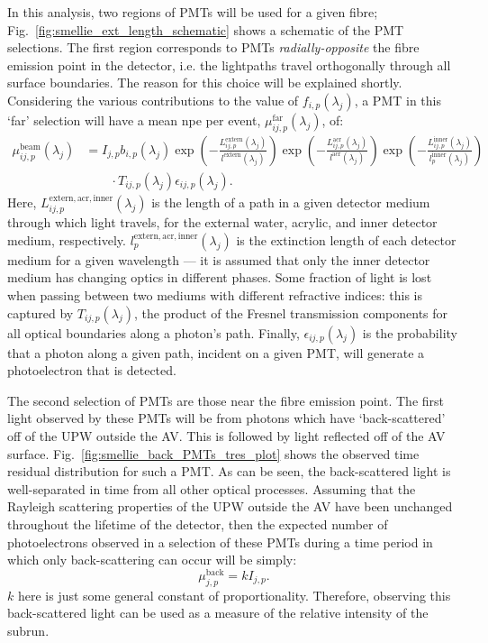 In this analysis, two regions of PMTs will be used for a given fibre; Fig.~\ref{fig:smellie_ext_length_schematic} shows a schematic of the PMT selections. The first region corresponds to PMTs \textit{radially-opposite} the fibre emission point in the detector, i.e. the lightpaths travel orthogonally through all surface boundaries. The reason for this choice will be explained shortly. Considering the various contributions to the value of $f_{i,p}(\lambda_{j})$, a PMT in this `far' selection will have a mean npe per event, $\mu_{ij,p}^{\mathrm{far}}(\lambda_{j})$, of:
\begin{align}\label{eq:smellie_ext_length_theory}
    \mu_{ij,p}^{\mathrm{beam}}(\lambda_{j}) &= I_{j,p}b_{i,p}(\lambda_{j})
    \exp\left(
        -\frac{L_{ij,p}^{\mathrm{extern}}(\lambda_{j})}{l^{\mathrm{extern}}(\lambda_{j})}
    \right)
    \exp\left(
        -\frac{L_{ij,p}^{\mathrm{acr}}(\lambda_{j})}{l^{\mathrm{acr}}(\lambda_{j})}
    \right)
    \exp\left(
        -\frac{L_{ij,p}^{\mathrm{inner}}(\lambda_{j})}{l_{p}^{\mathrm{inner}}(\lambda_{j})}
    \right)\nonumber\\
    & \qquad\cdot T_{ij,p}(\lambda_{j})\epsilon_{ij,p}(\lambda_{j}).
\end{align}
Here, $L_{ij,p}^{\mathrm{extern,acr,inner}}(\lambda_{j})$ is the length of a path in a given detector medium through which light travels, for the external water, acrylic, and inner detector medium, respectively. $l_{p}^{\mathrm{extern,acr,inner}}(\lambda_{j})$ is the extinction length of each detector medium for a given wavelength --- it is assumed that only the inner detector medium has changing optics in different phases. Some fraction of light is lost when passing between two mediums with different refractive indices: this is captured by $T_{ij,p}(\lambda_{j})$, the product of the Fresnel transmission components for all optical boundaries along a photon's path. Finally, $\epsilon_{ij,p}(\lambda_{j})$ is the probability that a photon along a given path, incident on a given PMT, will generate a photoelectron that is detected. 

The second selection of PMTs are those near the fibre emission point. The first light observed by these PMTs will be from photons which have `back-scattered' off of the UPW outside the AV. This is followed by light reflected off of the AV surface. Fig.~\ref{fig:smellie_back_PMTs_tres_plot} shows the observed time residual distribution for such a PMT. As can be seen, the back-scattered light is well-separated in time from all other optical processes. %
Assuming that the Rayleigh scattering properties of the UPW outside the AV have been unchanged throughout the lifetime of the detector, then the expected number of photoelectrons observed in a selection of these PMTs during a time period in which only back-scattering can occur will be simply:
\begin{equation}
    \mu_{j,p}^{\mathrm{back}} = kI_{j,p}.
\end{equation}
$k$ here is just some general constant of proportionality. Therefore, observing this back-scattered light can be used as a measure of the relative intensity of the subrun.

